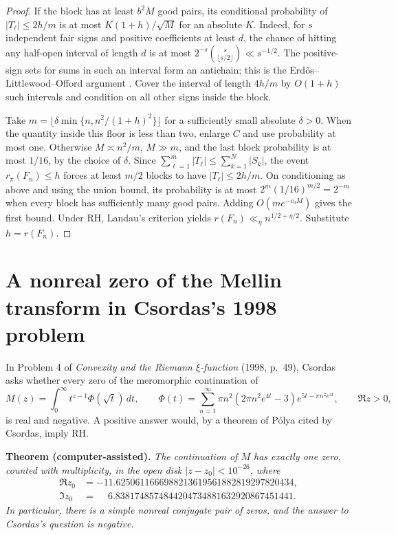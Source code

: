 \documentclass[11pt,a4paper]{article}
\begin{document}
\begin{proof}
If the block has at least $b^2M$ good pairs, its conditional probability
of $|T_\ell|\le 2h/m$ is at most $K(1+h)/\sqrt M$ for an absolute $K$.
Indeed, for $s$ independent fair signs and positive coefficients
at least $d$, the chance of hitting any half-open interval of length $d$
is at most $2^{-s}\binom{s}{\lfloor s/2\rfloor}\ll s^{-1/2}$.
The positive-sign sets for sums in such an interval form an antichain;
this is the Erd\H{o}s--Littlewood--Offord argument \cite{erdoslo}.
Cover the interval of length $4h/m$ by $O(1+h)$ such intervals and
condition on all other signs inside the block.

Take $m=\lfloor\delta\min\{n,n^2/(1+h)^2\}\rfloor$ for a sufficiently
small absolute $\delta>0$. When the quantity inside this floor is
less than two, enlarge $C$ and use probability at most one.
Otherwise $M\asymp n^2/m$, $M\gg m$, and the last block probability
is at most $1/16$, by the choice of $\delta$. Since
$\sum_{\ell=1}^m |T_\ell|\le\sum_{k=1}^N|S_k|$, the event
$r_\pi(F_n)\le h$ forces at least $m/2$ blocks to have
$|T_\ell|\le2h/m$. On conditioning as above and using the union bound,
its probability is at most $2^m(1/16)^{m/2}=2^{-m}$ when every block
has sufficiently many good pairs. Adding $O(me^{-c_0M})$ gives the
first bound. Under RH, Landau's criterion yields
$r(F_n)\ll_\eta n^{1/2+\eta/2}$. Substitute $h=r(F_n)$.
\end{proof}

\section{A nonreal zero of the Mellin transform in Csordas's 1998 problem}\label{sec:mellinzero}

In Problem 4 of \emph{Convexity and the Riemann $\xi$-function}
(1998, p.~49), Csordas asks whether every zero of the meromorphic
continuation of
\[
 M(z)=\int_0^\infty t^{z-1}\Phi(\sqrt t)\,dt,\qquad
 \Phi(t)=\sum_{n=1}^{\infty}\pi n^2(2\pi n^2e^{4t}-3)
                e^{5t-\pi n^2e^{4t}},
 \qquad \Re z>0,
\]
is real and negative. A positive answer would, by a theorem of
P\'olya cited by Csordas, imply RH.

\medskip\noindent
\textbf{Theorem (computer-assisted).}
\emph{The continuation of $M$ has exactly one zero, counted with
multiplicity, in the open disk $|z-z_0|<10^{-26}$, where}
\[
 \begin{split}
 \Re z_0&=-11.6250611666988213619561882819297820434,\\
 \Im z_0&=\phantom{-}6.8381748574844204734881632920867451441 .
 \end{split}
\]
\emph{In particular, there is a simple nonreal conjugate pair of zeros,
and the answer to Csordas's question is negative.}
\end{document}
